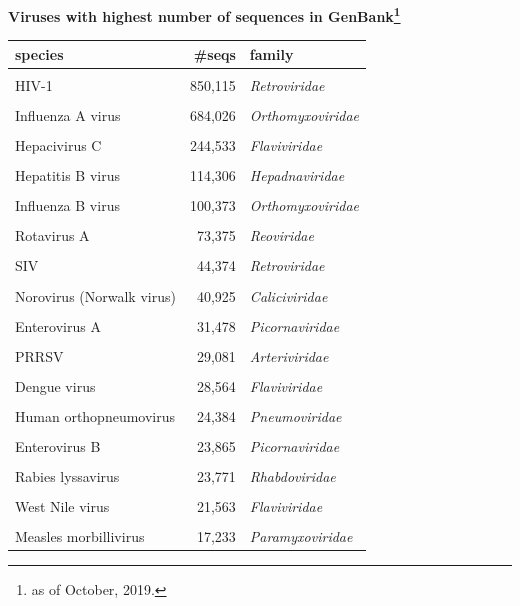 \documentclass[landscape]{slides}
\begin{document}
\begin{slide}
\begin{center}

\textbf{Viruses with highest number of sequences in GenBank\footnote{as of October, 2019.}}

\tiny
\begin{tabular}{lrl}
species                   &       \#seqs & family           \\ \hline
& & \\
HIV-1                     &      850,115 & \emph{Retroviridae}     \\ %
& & \\
Influenza A virus         &      684,026 & \emph{Orthomyxoviridae} \\ %
& & \\
Hepacivirus C             &      244,533 & \emph{Flaviviridae}     \\ %
& & \\
Hepatitis B virus         &      114,306 & \emph{Hepadnaviridae}   \\ %
& & \\
Influenza B virus         &      100,373 & \emph{Orthomyxoviridae} \\ %
& & \\
Rotavirus A               &       73,375 & \emph{Reoviridae}       \\ %
& & \\
SIV                       &       44,374 & \emph{Retroviridae}     \\ %
& & \\
Norovirus (Norwalk virus) &       40,925 & \emph{Caliciviridae}    \\ %
& & \\
Enterovirus A             &       31,478 & \emph{Picornaviridae}   \\ %
& & \\
PRRSV                     &       29,081 & \emph{Arteriviridae}    \\ %
& & \\
Dengue virus              &       28,564 & \emph{Flaviviridae}     \\ %
& & \\
Human orthopneumovirus    &       24,384 & \emph{Pneumoviridae}    \\ %
& & \\
Enterovirus B             &       23,865 & \emph{Picornaviridae}   \\ %
& & \\
Rabies lyssavirus         &       23,771 & \emph{Rhabdoviridae}    \\ %
& & \\
West Nile virus           &       21,563 & \emph{Flaviviridae}     \\ %
& & \\
Measles morbillivirus     &       17,233 & \emph{Paramyxoviridae}  \\ %
\end{tabular}





\end{center}
\end{slide}
\end{document}
